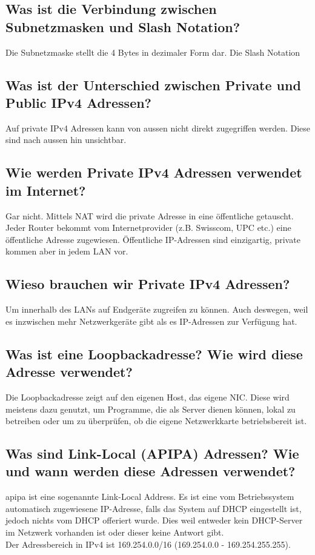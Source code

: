 \subsection*{Was ist die Verbindung zwischen Subnetzmasken und \flqq Slash Notation\frqq{}?}
Die Subnetzmaske stellt die 4 Bytes in dezimaler Form dar. Die Slash Notation

\subsection*{Was ist der Unterschied zwischen Private und Public IPv4 Adressen?}\label{sub:private_public_IP}
Auf private IPv4 Adressen kann von aussen nicht direkt zugegriffen werden. Diese sind nach aussen hin unsichtbar.

\subsection*{Wie werden Private IPv4 Adressen verwendet im Internet?}
Gar nicht. Mittels NAT wird die private Adresse in eine öffentliche getauscht. Jeder Router bekommt vom Internetprovider (z.B. Swisscom, UPC etc.) eine öffentliche Adresse zugewiesen. Öffentliche IP-Adressen sind einzigartig, private kommen aber in jedem LAN vor.

\subsection*{Wieso brauchen wir Private IPv4 Adressen?}
Um innerhalb des LANs auf Endgeräte zugreifen zu können. Auch deswegen, weil es inzwischen mehr Netzwerkgeräte gibt als es IP-Adressen zur Verfügung hat.

\subsection*{Was ist eine Loopbackadresse? Wie wird diese Adresse verwendet?}
Die Loopbackadresse zeigt auf den eigenen Host, das eigene NIC. Diese wird meistens dazu genutzt, um Programme, die als Server dienen können, lokal zu betreiben oder um zu überprüfen, ob die eigene Netzwerkkarte betriebsbereit ist.

\subsection*{Was sind \flqq Link-Local\frqq{} (APIPA) Adressen? Wie und wann werden diese Adressen verwendet?}\label{sub:APIPA}
\acrfull{apipa} ist eine sogenannte Link-Local Address. Es ist eine vom Betriebssystem automatisch zugewiesene IP-Adresse, falls das System auf DHCP eingestellt ist, jedoch nichts vom DHCP offeriert wurde. Dies weil entweder kein DHCP-Server im Netzwerk vorhanden ist oder dieser keine Antwort gibt.\\Der Adressbereich in IPv4 ist 169.254.0.0/16 (169.254.0.0 - 169.254.255.255).

